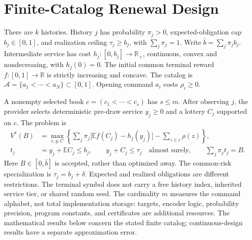 \section{Finite-Catalog Renewal Design}\label{sec:model52}
There are $k$ histories. History $j$ has probability $\pi_j>0$, expected-obligation cap $b_j\in[0,1]$, and realization ceiling $\tau_j\geq b_j$, with $\sum_j\pi_j=1$. Write $\bar b=\sum_j\pi_jb_j$. Intermediate service has cost $h_j:[0,b_j]\to\mathbb R_+$, continuous, convex and nondecreasing, with $h_j(0)=0$. The initial common terminal reward $f:[0,1]\to\mathbb R$ is strictly increasing and concave. The catalog is $\mathcal A=\{a_1<\cdots<a_N\}\subset[0,1]$. Opening command $a_i$ costs $\rho_i\geq0$.

A nonempty selected book $c=(c_1<\cdots<c_s)$ has $s\leq m$. After observing $j$, the provider selects deterministic pre-draw service $y_j\geq0$ and a lottery $C_j$ supported on $c$. The problem is
\begin{align}
 V^*(B)&=\max_{c,y,C}\left\{\sum_j\pi_j\bigl[\mathbb E f(C_j)-h_j(y_j)\bigr]-\sum_{z\in c}\rho(z)\right\},\label{eq:original52}\\
 t_j&=y_j+\mathbb E C_j\leq b_j,\qquad y_j+C_j\leq\tau_j\quad\text{almost surely},\qquad \sum_j\pi_jt_j=B.\label{eq:constraints52}
\end{align}
Here $B\in[0,\bar b]$ is accepted, rather than optimized away. The common-risk specialization is $\tau_j=b_j+\delta$. Expected and realized obligations are different restrictions. The terminal symbol does not carry a free history index, inherited service tier, or shared random seed. The cardinality $m$ measures the command alphabet, not total implementation storage: targets, encoder logic, probability precision, program constants, and certificates are additional resources. The mathematical results below concern the stated finite catalog; continuous-design results have a separate approximation error.

